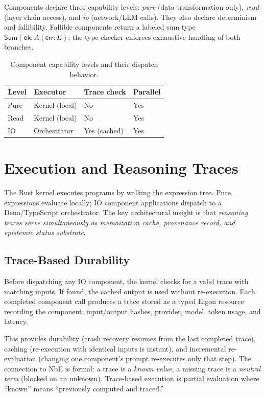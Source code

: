 \documentclass[10pt,twocolumn,letterpaper]{article}
\begin{document}
Components declare three capability levels: \emph{pure} (data transformation only), \emph{read} (layer chain access), and \emph{io} (network/LLM calls).
They also declare determinism and fallibility.
Fallible components return a labeled sum type $\mathsf{Sum}(\mathsf{ok} : A \mid \mathsf{err} : E)$; the type checker enforces exhaustive handling of both branches.

\begin{table}[t]
  \centering
  \small
  \caption{Component capability levels and their dispatch behavior.}
  \label{tab:capabilities}
  \begin{tabular}{@{}llll@{}}
    \toprule
    \textbf{Level} & \textbf{Executor} & \textbf{Trace check} & \textbf{Parallel} \\
    \midrule
    Pure & Kernel (local) & No & Yes \\
    Read & Kernel (local) & No & Yes \\
    IO   & Orchestrator   & Yes (cached) & Yes \\
    \bottomrule
  \end{tabular}
\end{table}


\section{Execution and Reasoning Traces}
\label{sec:traces}

The Rust kernel executes programs by walking the expression tree.
Pure expressions evaluate locally; IO component applications dispatch to a Deno/TypeScript orchestrator.
The key architectural insight is that \emph{reasoning traces serve simultaneously as memoization cache, provenance record, and epistemic status substrate}.

\subsection{Trace-Based Durability}

Before dispatching any IO component, the kernel checks for a valid trace with matching inputs.
If found, the cached output is used without re-execution.
Each completed component call produces a trace stored as a typed Eigon resource recording the component, input/output hashes, provider, model, token usage, and latency.

This provides durability (crash recovery resumes from the last completed trace), caching (re-execution with identical inputs is instant), and incremental re-evaluation (changing one component's prompt re-executes only that step).
The connection to NbE is formal: a trace is a \emph{known value}, a missing trace is a \emph{neutral term} (blocked on an unknown).
Trace-based execution is partial evaluation where ``known'' means ``previously computed and traced.''
\end{document}
